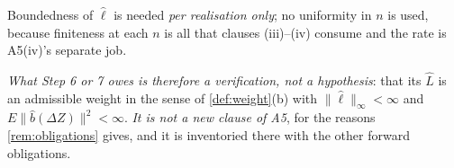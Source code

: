 \begin{remark}
Boundedness of $\hat\ell$ is needed \emph{per
realisation only}; no uniformity in $n$ is used, because finiteness at each $n$ is all that clauses
(iii)--(iv) consume and the rate is A5(iv)'s separate job.

\emph{What Step 6 or
7 owes is therefore a verification, not a hypothesis}: that its $\hat L$ is an admissible weight in the
sense of \cref{def:weight}(b) with $\|\hat\ell\|_\infty<\infty$ and $E\|\hat b(\Delta Z)\|^{2}<\infty$.
\emph{It is not a new clause of A5}, for the reasons \cref{rem:obligations} gives, and it is
inventoried there with the other forward obligations.
\end{remark}


